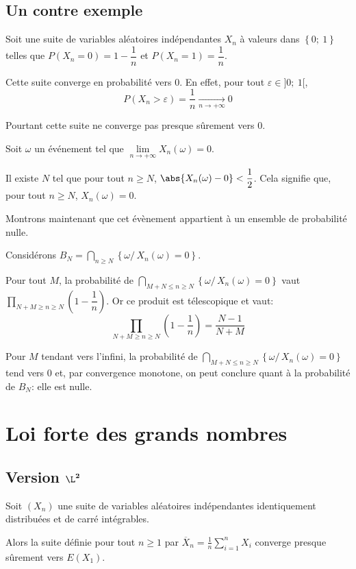 \subsection{Un contre exemple}

Soit une suite de variables aléatoires indépendantes $X_n$ à valeurs dans $\left\{ 0;~1\right \}$ telles que $P(X_n=0) = 1-\dfrac{1}{n}$ et $P(X_n=1) = \dfrac{1}{n}$.

Cette suite converge en probabilité vers $0$. En effet, pour tout $\varepsilon \in ]0;~1[$,
\[
P(X_n>\varepsilon) = \dfrac{1}{n} \underset{n \to +\infty}{\longrightarrow} 0
\]

Pourtant cette suite ne converge pas presque sûrement vers $0$.

Soit $\omega$ un événement tel que $\lim \limits_{n \to +\infty} X_n(\omega) = 0$. 

Il existe $N$ tel que pour tout $n \geq N$, $\abs{X_n(\omega)-0} < \dfrac{1}{2}$. Cela signifie que, pour tout $n \geq N$, $X_n(\omega)=0$. 

Montrons maintenant que cet évènement appartient à un ensemble de probabilité nulle.

Considérons $B_N = \bigcap \limits_{n \geq N} \left \{ \omega/ \, X_n(\omega) = 0 \right \}$.

Pour tout $M$, la probabilité de $\bigcap \limits_{M+N\leq n \geq N} \left \{ \omega/ \, X_n(\omega) = 0 \right \}$ vaut $\displaystyle{\prod \limits_{N+M \geq n \geq  N}} \left(1-\dfrac{1}{n}\right)$. Or ce produit est télescopique et vaut:
\[
\displaystyle{\prod \limits_{N+M \geq n \geq  N}} \left(1-\dfrac{1}{n}\right) = \dfrac{N-1}{N+M}
\]

Pour $M$ tendant vers l'infini, la probabilité de $\bigcap \limits_{M+N\leq n \geq N} \left \{ \omega/ \, X_n(\omega) = 0 \right \}$ tend vers $0$ et, par convergence monotone, on peut conclure quant à la probabilité de $B_N$: elle est nulle.

\section{Loi forte des grands nombres}


\subsection{Version $\mathbf{\L^2}$}

\begin{theo}
Soit $(X_n)$ une suite de variables aléatoires indépendantes identiquement distribuées et de carré intégrables.

\medskip
Alors la suite définie pour tout $n \geq 1$ par $\overline{X}_n = \frac{1}{n} \displaystyle{\sum_{i=1}^n} X_i$ converge presque sûrement vers $E(X_1)$.
\end{theo}

